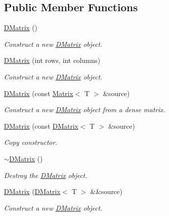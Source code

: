 \subsection*{Public Member Functions}
\begin{DoxyCompactItemize}
\item 
\mbox{\hyperlink{class_d_matrix_a92089f0346240ccd1bf6ac6888e51f75}{D\+Matrix}} ()
\begin{DoxyCompactList}\small\item\em Construct a new \mbox{\hyperlink{class_d_matrix}{D\+Matrix}} object. \end{DoxyCompactList}\item 
\mbox{\hyperlink{class_d_matrix_a002c3303de571ec5f18e7da699a209a2}{D\+Matrix}} (int rows, int columns)
\begin{DoxyCompactList}\small\item\em Construct a new \mbox{\hyperlink{class_d_matrix}{D\+Matrix}} object. \end{DoxyCompactList}\item 
\mbox{\hyperlink{class_d_matrix_a87bb9bff38ff9c1fd207bd84d8068455}{D\+Matrix}} (const \mbox{\hyperlink{class_matrix}{Matrix}}$<$ T $>$ \&source)
\begin{DoxyCompactList}\small\item\em Construct a new \mbox{\hyperlink{class_d_matrix}{D\+Matrix}} object from a dense matrix. \end{DoxyCompactList}\item 
\mbox{\hyperlink{class_d_matrix_a3bd6591c7b6cddbbb4fda8d036c59dac}{D\+Matrix}} (const \mbox{\hyperlink{class_d_matrix}{D\+Matrix}}$<$ T $>$ \&source)
\begin{DoxyCompactList}\small\item\em Copy constructor. \end{DoxyCompactList}\item 
\mbox{\hyperlink{class_d_matrix_a637d095ef25df70c10175a90b12d49c3}{$\sim$\+D\+Matrix}} ()
\begin{DoxyCompactList}\small\item\em Destroy the \mbox{\hyperlink{class_d_matrix}{D\+Matrix}} object. \end{DoxyCompactList}\item 
\mbox{\hyperlink{class_d_matrix_a8a9abe6ba48c4e8e05376bf8f5ae6081}{D\+Matrix}} (\mbox{\hyperlink{class_d_matrix}{D\+Matrix}}$<$ T $>$ \&\&source)
\begin{DoxyCompactList}\small\item\em Construct a new \mbox{\hyperlink{class_d_matrix}{D\+Matrix}} object. \end{DoxyCompactList}\item 

\end{DoxyCompactItemize}
